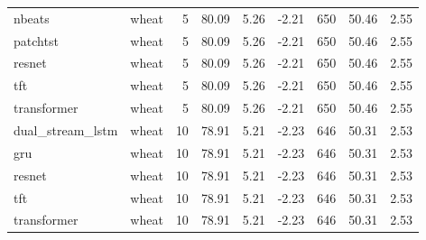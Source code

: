 \begin{tabular}{llrrrrrrr}
nbeats & wheat & 5 & 80.09 & 5.26 & -2.21 & 650 & 50.46 & 2.55 \\
patchtst & wheat & 5 & 80.09 & 5.26 & -2.21 & 650 & 50.46 & 2.55 \\
resnet & wheat & 5 & 80.09 & 5.26 & -2.21 & 650 & 50.46 & 2.55 \\
tft & wheat & 5 & 80.09 & 5.26 & -2.21 & 650 & 50.46 & 2.55 \\
transformer & wheat & 5 & 80.09 & 5.26 & -2.21 & 650 & 50.46 & 2.55 \\
dual_stream_lstm & wheat & 10 & 78.91 & 5.21 & -2.23 & 646 & 50.31 & 2.53 \\
gru & wheat & 10 & 78.91 & 5.21 & -2.23 & 646 & 50.31 & 2.53 \\
resnet & wheat & 10 & 78.91 & 5.21 & -2.23 & 646 & 50.31 & 2.53 \\
tft & wheat & 10 & 78.91 & 5.21 & -2.23 & 646 & 50.31 & 2.53 \\
transformer & wheat & 10 & 78.91 & 5.21 & -2.23 & 646 & 50.31 & 2.53 \\
\bottomrule
\end{tabular}
